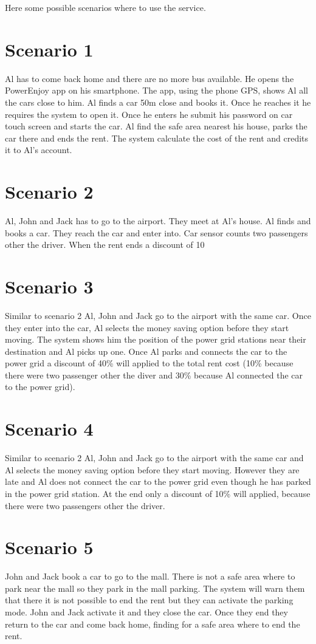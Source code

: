 Here some possible scenarios where to use the service.
\section{Scenario 1}
Al has to come back home and there are no more bus available. He opens the PowerEnjoy app on his smartphone. The app, using the phone GPS, shows Al all the cars close to him. Al finds a car 50m close and books it. Once he reaches it he requires the system to open it. Once he enters he submit his password on car touch screen and starts the car. Al find the safe area nearest his house, parks the car there and ends the rent. The system calculate the cost of the rent and credits it to Al's account.
\section{Scenario 2}
Al, John and Jack has to go to the airport. They meet at Al's house. Al finds and books a car. They reach the car and enter into. Car sensor counts two passengers other the driver. When the rent ends a discount of 10%
\section{Scenario 3}
Similar to scenario 2 Al, John and Jack go to the airport with the same car. Once they enter into the car, Al selects the money saving option before they start moving. The system shows him the position of the power grid stations near their destination and Al picks up one. Once Al parks and connects the car to the power grid a discount of 40\% will applied to the total rent cost (10\% because there were two passenger other the diver and 30\% because Al connected the car to the power grid).
\section{Scenario 4}
Similar to scenario 2 Al, John and Jack go to the airport with the same car and Al selects the money saving option before they start moving. However they are late and Al does not connect the car to the power grid even though he has parked in the power grid station. At the end only a discount of 10\% will applied, because there were two passengers other the driver.
\section{Scenario 5}
John and Jack book a car to go to the mall. There is not a safe area where to park near the mall so they park in the mall parking. The system will warn them that there it is not possible to end the rent but they can activate the parking mode. John and Jack activate it and they close the car. Once they end they return to the car and come back home, finding for a safe area where to end the rent.
